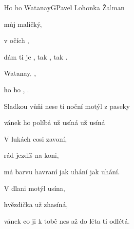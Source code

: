 \setcounter{page}{27}
\begin{song}{Ho ho Watanay}{G}{Pavel Lohonka Žalman}

\begin{SBVerse}

 můj maličký,

 v očích ,

dám ti je , tak , tak .

\end{SBVerse}

\begin{SBChorus}

 Watanay,  ,

ho ho ,  .

\end{SBChorus}

\begin{SBVerse}

Sladkou vůňi nese ti noční motýl z paseky

vánek ho políbá už usíná už usíná

\end{SBVerse}

\begin{SBChorus}

\end{SBChorus}

\begin{SBVerse}

V lukách cosi zavoní,

rád jezdíš na koni,

má barvu havraní jak uhání jak uhání.

\end{SBVerse}

\begin{SBChorus}

\end{SBChorus}

\begin{SBVerse}

V dlani motýl usína,

hvězdička už zhasíná,

vánek co ji k tobě nes až do léta ti odlétá.

\end{SBVerse}

\begin{SBChorus}

\end{SBChorus}

\end{song}

\clearpage
